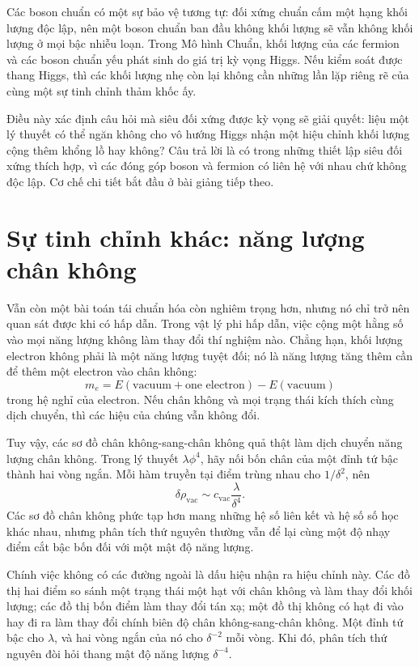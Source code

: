 Các boson chuẩn có một sự bảo vệ tương tự: đối xứng chuẩn cấm một hạng khối lượng độc lập, nên một boson chuẩn ban đầu không khối lượng sẽ vẫn không khối lượng ở mọi bậc nhiễu loạn. Trong Mô hình Chuẩn, khối lượng của các fermion và các boson chuẩn yếu phát sinh do giá trị kỳ vọng Higgs. Nếu kiểm soát được thang Higgs, thì các khối lượng nhẹ còn lại không cần những lần lặp riêng rẽ của cùng một sự tinh chỉnh thảm khốc ấy.

Điều này xác định câu hỏi mà siêu đối xứng được kỳ vọng sẽ giải quyết: liệu một lý thuyết có thể ngăn không cho vô hướng Higgs nhận một hiệu chỉnh khối lượng cộng thêm khổng lồ hay không? Câu trả lời là có trong những thiết lập siêu đối xứng thích hợp, vì các đóng góp boson và fermion có liên hệ với nhau chứ không độc lập. Cơ chế chi tiết bắt đầu ở bài giảng tiếp theo.

\section{Sự tinh chỉnh khác: năng lượng chân không}

Vẫn còn một bài toán tái chuẩn hóa còn nghiêm trọng hơn, nhưng nó chỉ trở nên quan sát được khi có hấp dẫn. Trong vật lý phi hấp dẫn, việc cộng một hằng số vào mọi năng lượng không làm thay đổi thí nghiệm nào. Chẳng hạn, khối lượng electron không phải là một năng lượng tuyệt đối; nó là năng lượng tăng thêm cần để thêm một electron vào chân không:
\begin{equation}
m_e=E(\text{vacuum}+\text{one electron})-E(\text{vacuum})
\end{equation}
trong hệ nghỉ của electron. Nếu chân không và mọi trạng thái kích thích cùng dịch chuyển, thì các hiệu của chúng vẫn không đổi.

Tuy vậy, các sơ đồ chân không-sang-chân không quả thật làm dịch chuyển năng lượng chân không. Trong lý thuyết \(\lambda\phi^4\), hãy nối bốn chân của một đỉnh tứ bậc thành hai vòng ngắn. Mỗi hàm truyền tại điểm trùng nhau cho \(1/\delta^2\), nên
\begin{equation}
\delta\rho_{\mathrm{vac}}
\sim
c_{\mathrm{vac}}\frac{\lambda}{\delta^4}.
\label{eq:vacuum-energy-divergence}
\end{equation}
Các sơ đồ chân không phức tạp hơn mang những hệ số liên kết và hệ số số học khác nhau, nhưng phân tích thứ nguyên thường vẫn để lại cùng một độ nhạy điểm cắt bậc bốn đối với một mật độ năng lượng.

Chính việc không có các đường ngoài là dấu hiệu nhận ra hiệu chỉnh này. Các đồ thị hai điểm so sánh một trạng thái một hạt với chân không và làm thay đổi khối lượng; các đồ thị bốn điểm làm thay đổi tán xạ; một đồ thị không có hạt đi vào hay đi ra làm thay đổi chính biên độ chân không-sang-chân không. Một đỉnh tứ bậc cho \(\lambda\), và hai vòng ngắn của nó cho \(\delta^{-2}\) mỗi vòng. Khi đó, phân tích thứ nguyên đòi hỏi thang mật độ năng lượng \(\delta^{-4}\).

